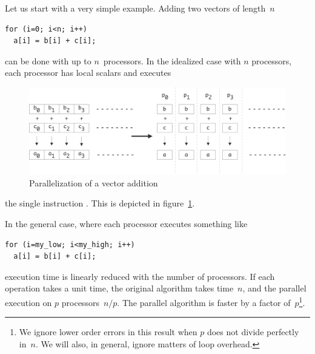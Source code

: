 Let us start with a very simple example. Adding two vectors of length~$n$
\begin{verbatim}
for (i=0; i<n; i++)
  a[i] = b[i] + c[i];
\end{verbatim}
can be done with up to $n$~processors. In the idealized case with $n$
processors, each processor has local scalars  and executes
\begin{figure}[ht]
  \includegraphics[scale=.11]{graphics-public/parallel-add}
  \caption{Parallelization of a vector addition}
  \label{fig:par-add}
\end{figure}
the single instruction . This is depicted in
figure~\ref{fig:par-add}.

In the general case, where each processor executes something like
\begin{verbatim}
for (i=my_low; i<my_high; i++)
  a[i] = b[i] + c[i];
\end{verbatim}
execution time is linearly
reduced with the number of processors. If each operation takes a unit
time, the original algorithm takes time~$n$, and the parallel
execution on $p$ processors~$n/p$. The parallel algorithm is faster by
a factor of~$p$\footnote{We ignore lower order errors in this result
  when $p$ does not divide perfectly in~$n$. We will also, in general,
ignore matters of loop overhead.}.

